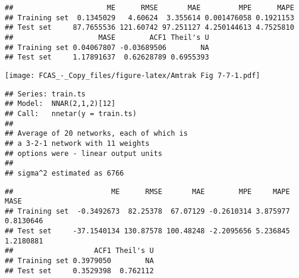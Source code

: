 \documentclass[]{article}
\begin{document}
\begin{verbatim}
##                      ME      RMSE       MAE         MPE      MAPE
## Training set  0.1345029   4.60624  3.355614 0.001476058 0.1921153
## Test set     87.7655536 121.60742 97.251127 4.250144613 4.7525810
##                    MASE        ACF1 Theil's U
## Training set 0.04067807 -0.03689506        NA
## Test set     1.17891637  0.62628789 0.6955393
\end{verbatim}

\texttt{[image: FCAS\_-\_Copy\_files/figure-latex/Amtrak Fig 7-7-1.pdf]}

\begin{verbatim}
## Series: train.ts 
## Model:  NNAR(2,1,2)[12] 
## Call:   nnetar(y = train.ts)
## 
## Average of 20 networks, each of which is
## a 3-2-1 network with 11 weights
## options were - linear output units 
## 
## sigma^2 estimated as 6766
\end{verbatim}

\begin{verbatim}
##                       ME      RMSE       MAE        MPE     MAPE      MASE
## Training set  -0.3492673  82.25378  67.07129 -0.2610314 3.875977 0.8130646
## Test set     -37.1540134 130.87578 100.48248 -2.2095656 5.236845 1.2180881
##                   ACF1 Theil's U
## Training set 0.3979050        NA
## Test set     0.3529398  0.762112
\end{verbatim}
\end{document}
